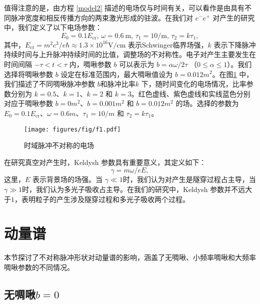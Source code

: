 值得注意的是，由方程 \eqref{model2} 描述的电场仅与时间有关，可以看作是由具有不同脉冲宽度和相反传播方向的两束激光形成的驻波。在我们对 ${e^{-}e^{+}}$ 对产生的研究中，我们定义了以下电场参数：
\begin{equation}\label{eq:foobar}
E_{0}=0.1 E_{\mathrm{cr}}, \, \omega=0.6 \mathrm{~m}, \, \tau_{1}=10 / \mathrm{m},  \, \tau_{2}=k \tau_{1},
\end{equation}
其中，$E_{\mathrm{cr}}=m^2c^3/e\hbar\approx1.3\times10^{16}\mathrm{V/cm}$ 表示Schwinger临界场强，$k$ 表示下降脉冲持续时间与上升脉冲持续时间的比值，调整场的不对称性。电子对产生主要发生在时间间隔 $ -\tau < t< \tau $ 内，啁啾参数 $b$ 可以表示为 $b= \alpha \omega /2\tau$ （$0\le \alpha \le 1$）。我们选择将啁啾参数 $b$ 设定在标准范围内，最大啁啾值设为 $ b = 0.012m^2 $。在图\ref{1} 中，我们描述了不同啁啾脉冲参数 $b$和脉冲比率$k$ 下，随时间变化的电场情况，比率参数分别为 $k = 0.5$、$k = 1$、$k = 2$ 和 $k = 3$。红色虚线、紫色虚线和实线蓝色分别对应于啁啾参数 $ b = 0 m^2$、$ b = 0.001m^2$ 和 $ b = 0.012m^2$ 的场。选择的参数为 $E_{0}=0.1 E_{\mathrm{cr}}$、$\omega=0.6m$、$\tau_{1}=10/m$ 和 $\tau_{2}=k \tau_{1}$。

\begin{figure}
  \centering
  \texttt{[image: figures/fig/f1.pdf]}
  \caption{时域脉冲不对称的电场}
  \label{1}
\end{figure}

在研究真空对产生时，Keldysh 参数具有重要意义，其定义如下：
\begin{equation}\label{gamma}
\gamma = m\omega /eE,
\end{equation}
这里，$E$ 表示背景场的场强。当 $\gamma \ll 1$时，我们认为对产生是隧穿过程占主导，当$\gamma \gg 1$时，我们认为多光子吸收占主导。在我们的研究中，Keldysh 参数并不远大于$1$，表明粒子的产生涉及隧穿过程和多光子吸收两个过程。

\section{动量谱}\label{momentum}
本节探讨了不对称脉冲形状对动量谱的影响，涵盖了无啁啾、小频率啁啾和大频率啁啾参数的不同情况。

\subsection{无啁啾\texorpdfstring{$b = 0$}{b=0}}

